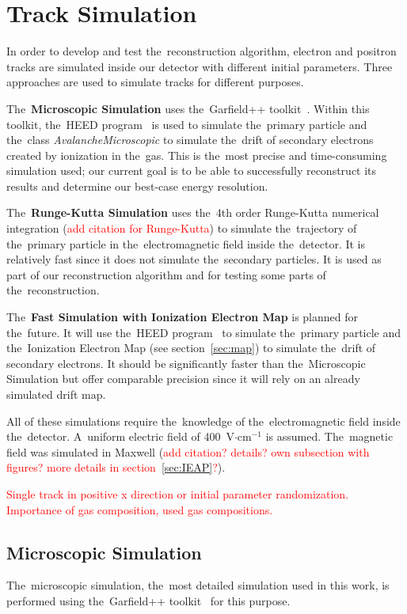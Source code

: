\chapter{Track Simulation}
	In order to develop and test the~reconstruction algorithm, electron and positron tracks are simulated inside our detector with different initial parameters. Three approaches are used to simulate tracks for different purposes.
	
	The~\textbf{Microscopic Simulation} uses the~Garfield++ toolkit~\cite{Garfield++}. Within this toolkit, the~\ac{HEED} program~\cite{HEED} is used to simulate the~primary particle and the~class \textit{AvalancheMicroscopic} to simulate the~drift of secondary electrons created by ionization in the~gas. This is the~most precise and time-consuming simulation used; our current goal is to be able to successfully reconstruct its results and determine our best-case energy resolution.
	
	The~\textbf{Runge-Kutta Simulation} uses the~4th order Runge-Kutta numerical integration (\textcolor{red}{add citation for Runge-Kutta}) to simulate the~trajectory of the~primary particle in the~electromagnetic field inside the~detector. It is relatively fast since it does not simulate the~secondary particles. It is used as part of our reconstruction algorithm and for testing some parts of the~reconstruction.
	
	The~\textbf{Fast Simulation with Ionization Electron Map} is planned for the~future. It will use the~\ac{HEED} program~\cite{HEED} to simulate the~primary particle and the~Ionization Electron Map (see section~\ref{sec:map}) to simulate the~drift of secondary electrons. It should be significantly faster than the~Microscopic Simulation but offer comparable precision since it will rely on an already simulated drift map.
	
	All of these simulations require the~knowledge of the~electromagnetic field inside the~detector. A~uniform electric field of 400~V$\cdot$cm$^{-1}$ is assumed. The~magnetic field was simulated in Maxwell (\textcolor{red}{add citation? details? own subsection with figures? more details in section~\ref{sec:IEAP}?}).
	
	\textcolor{red}{Single track in positive x direction or initial parameter randomization. Importance of gas composition, used gas compositions.}
	
	\section{Microscopic Simulation}
	\label{sec:microsim}
		The~microscopic simulation, the~most detailed simulation used in this work, is performed using the~Garfield++ toolkit~\cite{Garfield++} for this purpose. 
		
